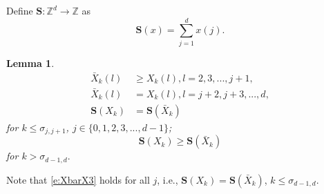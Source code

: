 \documentclass[11pt,a4paper]{article}
\newtheorem{lemma}{Lemma}
\begin{document}
Define ${\bm S} : {\mathbb Z}^d \rightarrow {\mathbb Z}$ as
\[
{\bm S}(x) = \sum_{j=1}^d x(j).
\]
\begin{lemma}\label{l:beforesigmadd1}
\begin{align}
\bar{X}_k(l) &\ge X_k(l), l=2,3,...,j+1, \label{e:XbarX1}\\
\bar{X}_k(l) &= X_k(l), l= j+2,j+3,...,d, \label{e:XbarX2}\\
{\bm S}( X_k) &= {\bm S}(\bar{X}_k) \label{e:XbarX3}
\end{align}
for $k \le \sigma_{j,j+1}$, $j \in \{0,1,2,3,...,d-1\}$;
\begin{equation}\label{e:XbarX4}
{\bm S}( X_k) \ge {\bm S}(\bar{X}_k) 
\end{equation}
for $k > \sigma_{d-1,d}.$
\end{lemma}
Note that \eqref{e:XbarX3} holds for all $j$, i.e., 
${\bm S}( X_k) = {\bm S}(\bar{X}_k)$, $k \le \sigma_{d-1,d}.$
\end{document}
